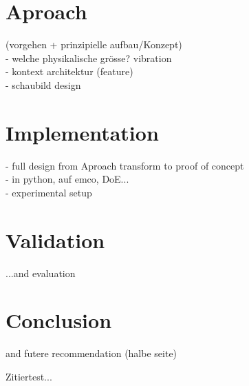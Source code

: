 \documentclass[5p,times,procedia]{elsarticle}
\newenvironment{note}{%
	\noindent
    \color{notecolor}%
}{%
    \par\medskip%
}
\begin{document}
\section{Aproach}
\begin{note}
	(vorgehen + prinzipielle aufbau/Konzept)\\
	- welche physikalische grösse? vibration\\
	- kontext architektur (feature)\\
	- schaubild design\\
	
\end{note}




\section{Implementation}

\begin{note}
- full design from Aproach transform to proof of concept\\
- in python, auf emco, DoE...\\
- experimental setup	
\end{note}

\section{Validation}
\begin{note}
	...and evaluation

\end{note}
\section{Conclusion}
\begin{note}
	and futere recommendation (halbe seite)
	
\end{note}






Zitiertest...

\cite{Al-Naggar.Jamil.ea2021,Axinte.Gindy2004a,Ma.Howard.ea2020}

\cite{Axinte.Gindy2004a}

\cite{Ma.Howard.ea2020}

\cite{Biermann.Zabel.ea2013}

\cite{Chen.Lin2017}

\end{document}
